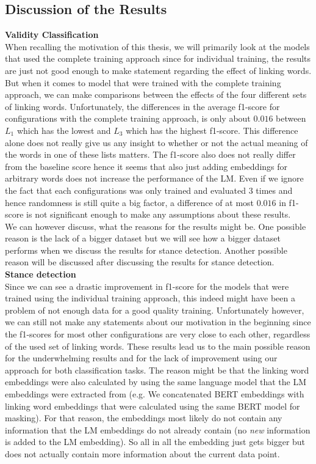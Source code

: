 \subsection{Discussion of the Results}
\textbf{Validity Classification} \\
When recalling the motivation of this thesis, we will primarily look at the models that used the complete training approach since for individual training, the results are just not good enough to make statement regarding the effect of linking words. But when it comes to model that were trained with the complete training approach, we can make comparisons between the effects of the four different sets of linking words. Unfortunately, the differences in the average f1-score for configurations with the complete training approach, is only about $0.016$ between $L_1$ which has the lowest and $L_3$ which has the highest f1-score. This difference alone does not really give us any insight to whether or not the actual meaning of the words in one of these lists matters. The f1-score also does not really differ from the baseline score hence it seems that also just adding embeddings for arbitrary words does not increase the performance of the LM. Even if we ignore the fact that each configurations was only trained and evaluated $3$ times and hence randomness is still quite a big factor, a difference of at most $0.016$ in f1-score is not significant enough to make any assumptions about these results. \\
We can however discuss, what the reasons for the results might be. One possible reason is the lack of a bigger dataset but we will see how a bigger dataset performs when we discuss the results for stance detection. Another possible reason will be discussed after discussing the results for stance detection. \\

\textbf{Stance detection} \\
Since we can see a drastic improvement in f1-score for the models that were trained using the individual training approach, this indeed might have been a problem of not enough data for a good quality training. Unfortunately however, we can still not make any statements about our motivation in the beginning since the f1-scores for most other configurations are very close to each other, regardless of the used set of linking words. These results lead us to the main possible reason for the underwhelming results and for the lack of improvement using our approach for both classification tasks. The reason might be that the linking word embeddings were also calculated by using the same language model that the LM embeddings were extracted from (e.g. We concatenated BERT embeddings with linking word embeddings that were calculated using the same BERT model for masking). For that reason, the embeddings most likely do not contain any information that the LM embeddings do not already contain (no \textit{new} information is added to the LM embedding). So all in all the embedding just gets bigger but does not actually contain more information about the current data point.